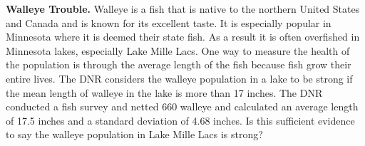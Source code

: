 \item \textbf{Walleye Trouble.} Walleye is a fish that is native to the northern United States and Canada and is known for its excellent taste. It is especially popular in Minnesota where it is deemed their state fish. As a result it is often overfished in Minnesota lakes, especially Lake Mille Lacs. One way to measure the health of the population is through the average length of the fish  because fish grow their entire lives. The DNR considers the walleye population in a lake to be strong if the mean length of walleye in the lake is more than 17 inches. The DNR conducted a fish survey and netted 660 walleye and calculated an average length of 17.5 inches and a standard deviation of 4.68 inches. Is this sufficient evidence to say the walleye population in Lake Mille Lacs is strong?  

